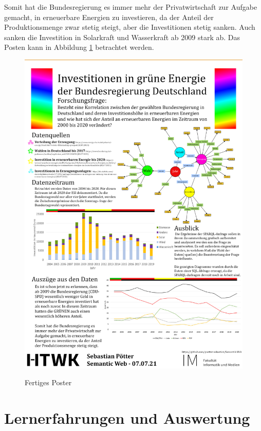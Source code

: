 \documentclass[12pt]{article}
\begin{document}
Somit hat die Bundesregierung es immer mehr der Privatwirtschaft zur Aufgabe gemacht, in erneuerbare Energien zu investieren, da der Anteil der Produktionsmenge zwar stetig steigt, aber die Investitionen stetig sanken. Auch sanken die Investition in Solarkraft und Wasserkraft ab 2009 stark ab. Das Posten kann in Abbildung \ref{fig:poster} betrachtet werden.

\begin{figure}[!ht]
    \caption{Fertiges Poster}
    \centering
    \includegraphics[width=1\textwidth]{images/poster.jpg}
    \label{fig:poster}
\end{figure}

    \section{Lernerfahrungen und Auswertung}
\end{document}
